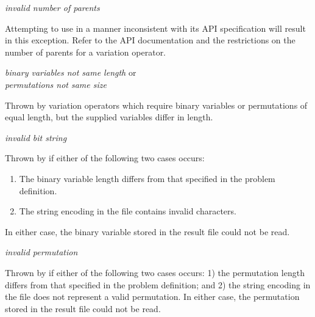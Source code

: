 \noindent
\textit{invalid number of parents}
\begin{indented}
  Attempting to use  in a manner inconsistent with its API specification will result in this exception.  Refer to the API documentation and the restrictions on the number of parents for a variation operator.
\end{indented}

\noindent
\textit{binary variables not same length} or\\
\textit{permutations not same size}
\begin{indented}
  Thrown by variation operators which require binary variables or permutations of equal length, but the supplied variables differ in length.
\end{indented}

\noindent  
\textit{invalid bit string}
\begin{indented}
  Thrown by  if either of the following two cases occurs:
  \begin{enumerate}
    \item The binary variable length differs from that specified in the problem definition.
    \item The string encoding in the file contains invalid characters.
  \end{enumerate}
  In either case, the binary variable stored in the result file could not be read.
\end{indented}

\noindent  
\textit{invalid permutation}
\begin{indented}
  Thrown by  if either of the following two cases occurs: 1) the permutation length differs from that specified in the problem definition; and 2) the string encoding in the file does not represent a valid permutation.  In either case, the permutation stored in the result file could not be read.
\end{indented}

